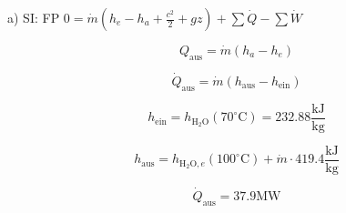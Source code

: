 a) SI: FP \quad \(0 = \dot{m} (h_e - h_a + \frac{c^2}{2} + gz) + \sum \dot{Q} - \sum \dot{W}\)

\[
Q_{\text{aus}} = \dot{m} (h_a - h_e)
\]

\[
\dot{Q}_{\text{aus}} = \dot{m} (h_{\text{aus}} - h_{\text{ein}})
\]

\[
h_{\text{ein}} = h_{\text{H}_2\text{O}} (70^\circ \text{C}) = 232.88 \frac{\text{kJ}}{\text{kg}}
\]

\[
h_{\text{aus}} = h_{\text{H}_2\text{O}, e} (100^\circ \text{C}) + \dot{m} \cdot 419.4 \frac{\text{kJ}}{\text{kg}}
\]

\[
\dot{Q}_{\text{aus}} = 37.9 \text{MW}
\]